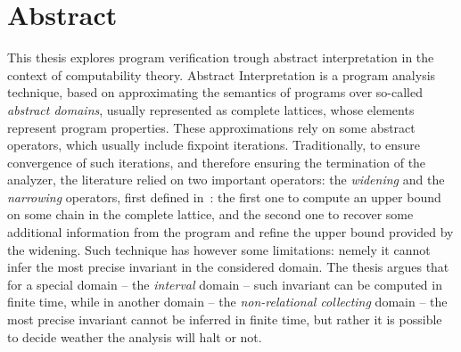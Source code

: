\begingroup

\chapter*{Abstract}
This thesis explores program verification trough abstract
interpretation in the context of computability theory. Abstract
Interpretation is a program analysis technique, based on approximating
the semantics of programs over so-called \emph{abstract domains},
usually represented as complete lattices, whose elements represent
program properties. These approximations rely on some abstract
operators, which usually include fixpoint iterations. Traditionally,
to ensure convergence of such iterations, and therefore ensuring the
termination of the analyzer, the literature relied on two important
operators: the \emph{widening} and the \emph{narrowing} operators,
first defined in~\cite{patrickradhia:one}: the first one to compute an
upper bound on some chain in the complete lattice, and the second one
to recover some additional information from the program and refine the
upper bound provided by the widening. Such technique has however some
limitations: nemely it cannot infer the most precise invariant in the
considered domain. The thesis argues that for a special domain -- the
\emph{interval} domain -- such invariant can be computed in finite
time, while in another domain -- the \emph{non-relational collecting}
domain -- the most precise invariant cannot be inferred in finite
time, but rather it is possible to decide weather the analysis will
halt or not.

\endgroup

\vfill
